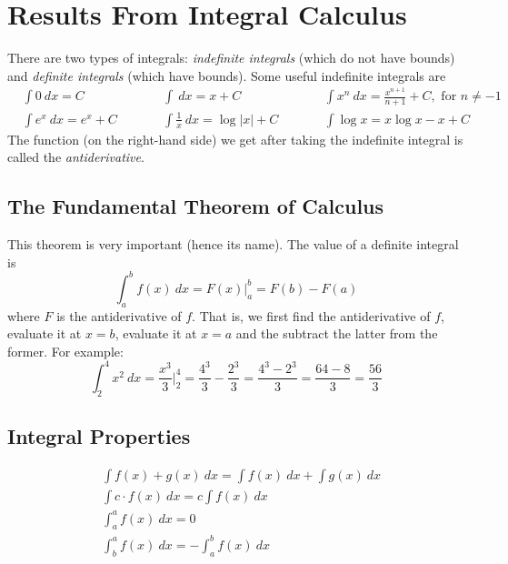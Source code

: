 \section{Results From Integral Calculus}

There are two types of integrals: \textit{indefinite integrals} (which do not have bounds) and 
\textit{definite integrals} (which have bounds). Some useful indefinite integrals are
\begin{equation*}
    \begin{aligned}
        & \int 0\ dx = C & \qquad & \int \ dx = x + C & \qquad & \int x^n\ dx = \frac{x^{n+1}}{n + 1} + C,\text{ for } n \neq -1 \\ 
        & \int e^x\ dx = e^x + C & \qquad &\int \frac{1}{x}\ dx = \log |x| + C & \qquad & \int \log x = x \log x - x + C
    \end{aligned}
\end{equation*}
The function (on the right-hand side) we get after taking the indefinite integral is called the \mbox{\textit{antiderivative}}. 

\subsection{The Fundamental Theorem of Calculus}

This theorem is very important (hence its name). The value of a 
definite integral is
\begin{equation*}
    \int_a^b f(x)\ dx = F(x)\Big|_a^b = F(b) - F(a)
\end{equation*}
where $F$ is the antiderivative of $f$. That is, we first find the antiderivative of $f$, evaluate 
it at $x = b$, evaluate it at $x = a$ and the subtract the latter from the former. For example:
\begin{equation*}
    \int_2^4 x^2\ dx = \frac{x^3}{3}\Big|_2^4 = \frac{4^3}{3} - \frac{2^3}{3} 
    = \frac{4^3 - 2^3}{3} = \frac{64 - 8}{3} = \frac{56}{3}
\end{equation*}

\subsection{Integral Properties}

\begin{equation*}
    \begin{aligned}
        & \int f(x) + g(x)\ dx = \int f(x)\ dx + \int g(x)\ dx  \\ 
        & \int c \cdot f(x)\ dx = c \int f(x)\ dx \\
        & \int_a^a f(x)\ dx = 0 \\ 
        & \int_b^a f(x)\ dx = - \int_a^b f(x)\ dx
    \end{aligned}
\end{equation*}

